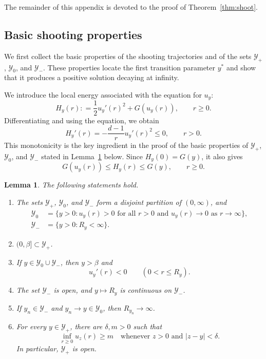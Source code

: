 \documentclass[12pt, a4paper, reqno]{amsart}
\numberwithin{equation}{section}
\newtheorem{lemma}[theorem]{Lemma}
\theoremstyle{definition}
\theoremstyle{remark}
\newcommand{\ce}{\mathrel{\mathop:}=}
\begin{document}
The remainder of this appendix is devoted to the proof of
Theorem~\ref{thm:shoot}.

\subsection{Basic shooting properties}

We first collect the basic properties of the shooting trajectories and of the
sets $\mathcal Y_+$, $\mathcal Y_0$, and $\mathcal Y_-$. These properties locate the first transition
parameter $y^*$ and show that it produces a positive solution decaying at
infinity.

We introduce the local energy associated with the equation for $u_y$:
\begin{equation*}
  H_y(r)\ce \frac12 u_y'(r)^2+G(u_y(r)),\qquad r\ge0.
\end{equation*}
Differentiating and using the equation, we obtain
\begin{equation*}
  H_y'(r)=-\frac{d-1}{r}u_y'(r)^2\le0,
  \qquad r>0.
\end{equation*}
This monotonicity is the key ingredient in the proof of the basic
properties of $\mathcal Y_+$, $\mathcal Y_0$, and $\mathcal Y_-$
stated in Lemma~\ref{lem:basic} below. Since $H_y(0)=G(y)$, it also
gives
\begin{equation*}
  G(u_y(r))\le H_y(r)\le G(y),
  \qquad r\ge0.
\end{equation*}

\begin{lemma}\label{lem:basic}
The following statements hold.
\begin{enumerate}
\item The sets $\mathcal Y_+$, $\mathcal Y_0$, and $\mathcal Y_-$ form a disjoint partition of
  $(0,\infty)$, and
  \begin{align*}
    \mathcal Y_0
      &=\{y>0:u_y(r)>0\text{ for all }r>0
          \text{ and }u_y(r)\to0\text{ as }r\to\infty\},\\
    \mathcal Y_-
      &=\{y>0:R_y<\infty\}.
  \end{align*}
\item $(0,\beta]\subset \mathcal Y_+$.
\item If $y\in \mathcal Y_0\cup \mathcal Y_-$, then $y>\beta$ and
  \[
    u_y'(r)<0\qquad (0<r\le R_y).
  \]
\item The set $\mathcal Y_-$ is open, and $y\mapsto R_y$ is continuous on
  $\mathcal Y_-$.
\item If $y_n\in \mathcal Y_-$ and $y_n\to y\in \mathcal Y_0$, then
  $R_{y_n}\to\infty$.
\item For every $y\in \mathcal Y_+$, there are $\delta,m>0$ such that
  \[
    \inf_{r\ge0}u_z(r)\ge m
    \quad\text{whenever }z>0\text{ and }|z-y|<\delta.
  \]
  In particular, $\mathcal Y_+$ is open.
\end{enumerate}
\end{lemma}
\end{document}
